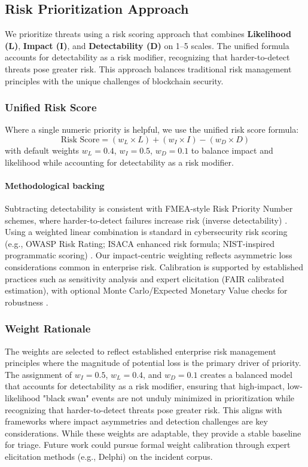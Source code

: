 \subsection{Risk Prioritization Approach}
\label{sec:risk_quantification}

We prioritize threats using a risk scoring approach that combines \textbf{Likelihood (L)}, \textbf{Impact (I)}, and \textbf{Detectability (D)} on 1--5 scales. The unified formula accounts for detectability as a risk modifier, recognizing that harder-to-detect threats pose greater risk. This approach balances traditional risk management principles with the unique challenges of blockchain security.

\subsubsection{Unified Risk Score}
Where a single numeric priority is helpful, we use the unified risk score formula:
\begin{equation}
    \text{Risk Score} = (w_L \times L) + (w_I \times I) - (w_D \times D)
\end{equation}
with default weights $w_L=0.4$, $w_I=0.5$, $w_D=0.1$ to balance impact and likelihood while accounting for detectability as a risk modifier.

\paragraph{Methodological backing} Subtracting detectability is consistent with FMEA-style Risk Priority Number schemes, where harder-to-detect failures increase risk (inverse detectability) \cite{WestgardDetectability,PQRI2015FMEA}. Using a weighted linear combination is standard in cybersecurity risk scoring (e.g., OWASP Risk Rating; ISACA enhanced risk formula; NIST-inspired programmatic scoring) \cite{OWASPRiskRating,ISACA2014EnhancedRisk,ZengRCNIST}. Our impact-centric weighting reflects asymmetric loss considerations common in enterprise risk. Calibration is supported by established practices such as sensitivity analysis and expert elicitation (FAIR calibrated estimation), with optional Monte Carlo/Expected Monetary Value checks for robustness \cite{FAIRCalibratedEstimation,RosemetQRA}.

\subsubsection{Weight Rationale}
The weights are selected to reflect established enterprise risk management principles where the magnitude of potential loss is the primary driver of priority. The assignment of $w_I=0.5$, $w_L=0.4$, and $w_D=0.1$ creates a balanced model that accounts for detectability as a risk modifier, ensuring that high-impact, low-likelihood "black swan" events are not unduly minimized in prioritization while recognizing that harder-to-detect threats pose greater risk. This aligns with frameworks where impact asymmetries and detection challenges are key considerations. While these weights are adaptable, they provide a stable baseline for triage. Future work could pursue formal weight calibration through expert elicitation methods (e.g., Delphi) on the incident corpus.

